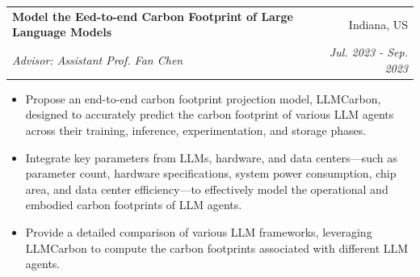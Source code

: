 \documentclass[letterpaper,10.8pt]{article}
\makeatletter
\newcommand{\resumeSubheading}[4]{
  \vspace{-1pt}\item
    \begin{tabular*}{0.97\textwidth}{l@{\extracolsep{\fill}}r}
      \textbf{#1} & #2 \\
      \textit{\small#3} & \textit{\small #4} \\
    \end{tabular*}\vspace{-5pt}
}
\makeatother
\begin{document}
\resumeSubheading
{Model the Eed-to-end Carbon Footprint of Large Language Models}{Indiana, US}
{Advisor: Assistant Prof. Fan Chen}{Jul. 2023 - Sep. 2023}
\begin{itemize}[label=$\circ$,leftmargin=0.15in]
\setlength\itemsep{-0.1em}
\item Propose an end-to-end carbon footprint projection model, LLMCarbon, designed to accurately predict the carbon footprint of various LLM agents across their training, inference, experimentation, and storage phases.
\item Integrate key parameters from LLMs, hardware, and data centers—such as parameter count, hardware specifications, system power consumption, chip area, and data center efficiency—to effectively model the operational and embodied carbon footprints of LLM agents.
\item Provide a detailed comparison of various LLM frameworks, leveraging LLMCarbon to compute the carbon footprints associated with different LLM agents. 
\end{itemize}


\end{document}
